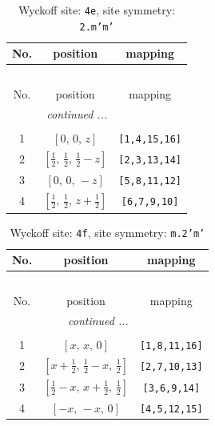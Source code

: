 \documentclass[fleqn,8pt]{jsarticle}
\begin{document}
\renewcommand{\arraystretch}{1.2}
\begin{longtable}{ccc}
\caption{Wyckoff site: {\tt 4e}, site symmetry: {\tt 2.m'm'}}
 \\
 \hline \hline
No. & position & mapping \\ \hline \endfirsthead

\multicolumn{2}{l}{\tablename\ \thetable{}} \\
 \hline \hline
No. & position & mapping \\ \hline \endhead

 \hline \hline
\multicolumn{2}{r}{\footnotesize\it continued ...} \\ \endfoot

 \hline \hline
\multicolumn{2}{r}{} \\ \endlastfoot

1 & $\left[ 0,\, 0,\, z \right]$ & {\tt [1,4,15,16]} \\ \hline
2 & $\left[ \frac{1}{2},\, \frac{1}{2},\, \frac{1}{2} - z \right]$ & {\tt [2,3,13,14]} \\ \hline
3 & $\left[ 0,\, 0,\, - z \right]$ & {\tt [5,8,11,12]} \\ \hline
4 & $\left[ \frac{1}{2},\, \frac{1}{2},\, z + \frac{1}{2} \right]$ & {\tt [6,7,9,10]} \\
\end{longtable}
\renewcommand{\arraystretch}{1.2}
\begin{longtable}{ccc}
\caption{Wyckoff site: {\tt 4f}, site symmetry: {\tt m.2'm'}}
 \\
 \hline \hline
No. & position & mapping \\ \hline \endfirsthead

\multicolumn{2}{l}{\tablename\ \thetable{}} \\
 \hline \hline
No. & position & mapping \\ \hline \endhead

 \hline \hline
\multicolumn{2}{r}{\footnotesize\it continued ...} \\ \endfoot

 \hline \hline
\multicolumn{2}{r}{} \\ \endlastfoot

1 & $\left[ x,\, x,\, 0 \right]$ & {\tt [1,8,11,16]} \\ \hline
2 & $\left[ x + \frac{1}{2},\, \frac{1}{2} - x,\, \frac{1}{2} \right]$ & {\tt [2,7,10,13]} \\ \hline
3 & $\left[ \frac{1}{2} - x,\, x + \frac{1}{2},\, \frac{1}{2} \right]$ & {\tt [3,6,9,14]} \\ \hline
4 & $\left[ - x,\, - x,\, 0 \right]$ & {\tt [4,5,12,15]} \\
\end{longtable}
\end{document}
